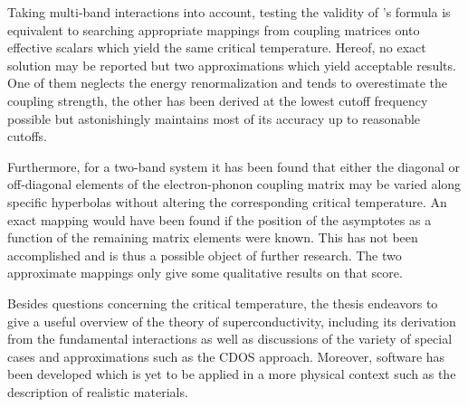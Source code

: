 Taking multi-band interactions into account, testing the validity of
's formula is equivalent to searching appropriate mappings from
coupling matrices onto effective scalars which yield the same critical
temperature. Hereof, no exact solution may be reported but two approximations
which yield acceptable results. One of them neglects the energy renormalization
and tends to overestimate the coupling strength, the other has been derived at
the lowest cutoff frequency possible but astonishingly maintains most of its
accuracy up to reasonable cutoffs.

Furthermore, for a two-band system it has been found that either the diagonal or
off-diagonal elements of the electron-phonon coupling matrix may be varied along
specific hyperbolas without altering the corresponding critical temperature. An
exact mapping would have been found if the position of the asymptotes as a
function of the remaining matrix elements were known. This has not been
accomplished and is thus a possible object of further research. The two
approximate mappings only give some qualitative results on that score.

Besides questions concerning the critical temperature, the thesis endeavors to
give a useful overview of the  theory of superconductivity,
including its derivation from the fundamental interactions as well as
discussions of the variety of special cases and approximations such as the CDOS
approach. Moreover, software has been developed which is yet to be applied in a
more physical context such as the description of realistic materials.
